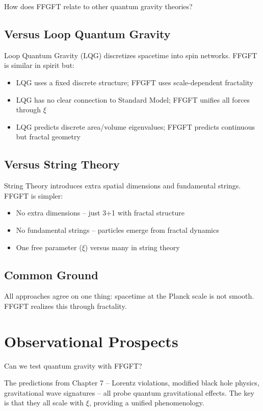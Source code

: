 	How does FFGFT relate to other quantum gravity theories?
	
	\subsection{Versus Loop Quantum Gravity}
	
	Loop Quantum Gravity (LQG) discretizes spacetime into spin networks. FFGFT is similar in spirit but:
	\begin{itemize}[leftmargin=*]
		\item LQG uses a fixed discrete structure; FFGFT uses scale-dependent fractality
		\item LQG has no clear connection to Standard Model; FFGFT unifies all forces through $\xi$
		\item LQG predicts discrete area/volume eigenvalues; FFGFT predicts continuous but fractal geometry
	\end{itemize}
	
	\subsection{Versus String Theory}
	
	String Theory introduces extra spatial dimensions and fundamental strings. FFGFT is simpler:
	\begin{itemize}[leftmargin=*]
		\item No extra dimensions -- just 3+1 with fractal structure
		\item No fundamental strings -- particles emerge from fractal dynamics
		\item One free parameter ($\xi$) versus many in string theory
	\end{itemize}
	
	\subsection{Common Ground}
	
	All approaches agree on one thing: spacetime at the Planck scale is not smooth. FFGFT realizes this through fractality.
	
	\section{Observational Prospects}
	
	Can we test quantum gravity with FFGFT?
	
	The predictions from Chapter 7 -- Lorentz violations, modified black hole physics, gravitational wave signatures -- all probe quantum gravitational effects. The key is that they all scale with $\xi$, providing a unified phenomenology.
	

